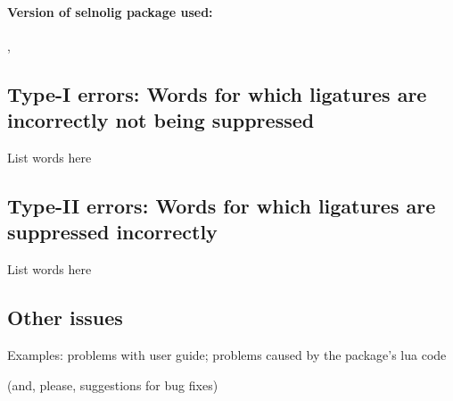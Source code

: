 \documentclass{article}
\begin{document}
\paragraph*{Version of selnolig package used:} 
\selnoligpackageversion, \selnoligpackagedate %

\subsection*{Type-I errors: Words for which ligatures are incorrectly not being suppressed}

List words here

\subsection*{Type-II errors: Words for which ligatures are suppressed incorrectly}

List words here

\subsection*{Other issues}

Examples: problems with user guide; problems caused by the package's lua code 

(and, please, suggestions for bug fixes)
\end{document}
